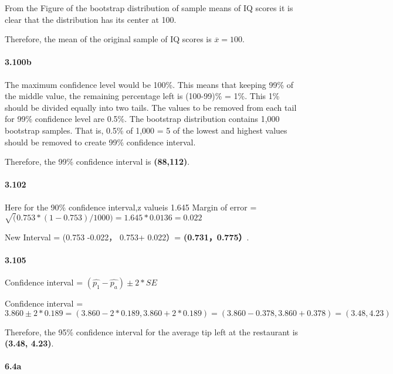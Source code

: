 \documentclass[
]{article}
\begin{document}
From the Figure of the bootstrap distribution of sample means of IQ
scores it is clear that the distribution has its center at 100.

Therefore, the mean of the original sample of IQ scores is
\(\overline{x}=100\).

\hypertarget{b-14}{%
\paragraph{3.100b}\label{b-14}}

The maximum confidence level would be 100\%. This means that keeping
99\% of the middle value, the remaining percentage left is (100-99)\% =
1\%. This 1\% should be divided equally into two tails. The values to be
removed from each tail for 99\% confidence level are 0.5\%. The
bootstrap distribution contains 1,000 bootstrap samples. That is, 0.5\%
of 1,000 = 5 of the lowest and highest values should be removed to
create 99\% confidence interval.

Therefore, the 99\% confidence interval is \textbf{(88,112)}.

\hypertarget{section-10}{%
\paragraph{3.102}\label{section-10}}

Here for the 90\% confidence interval,z valueis 1.645 Margin of error =
\(\sqrt(0.753*(1-0.753)/1000)= 1.645 * 0.0136= 0.022\)

New Interval = (0.753 -0.022， 0.753+ 0.022）= \textbf{(0.731，0.775）}.

\hypertarget{section-11}{%
\paragraph{3.105}\label{section-11}}

Confidence interval = \((\hat{p_1} - \hat{p_a}) \pm 2 *SE\)

Confidence interval =
\(3.860\pm 2*0.189 =(3.860-2 * 0.189,3.860+2 * 0.189) =(3.860-0.378,3.860 + 0.378) = (3.48,4.23)\)

Therefore, the 95\% confidence interval for the average tip left at the
restaurant is \textbf{(3.48, 4.23)}.

\hypertarget{a-15}{%
\paragraph{6.4a}\label{a-15}}
\end{document}
